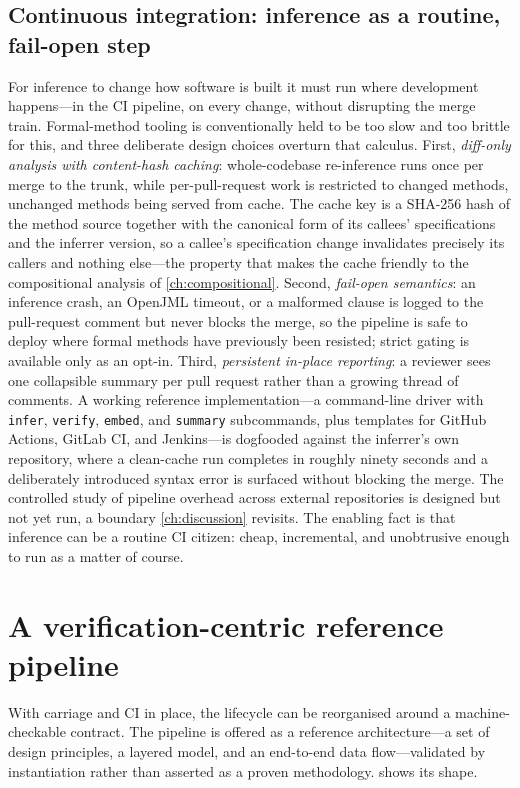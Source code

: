 \subsection{Continuous integration: inference as a routine, fail-open step}\label{sec:int-ci}

For inference to change how software is built it must run where development
happens---in the CI pipeline, on every change, without disrupting the merge train.
Formal-method tooling is conventionally held to be too slow and too brittle for
this, and three deliberate design choices overturn that calculus. First,
\emph{diff-only analysis with content-hash caching}: whole-codebase re-inference
runs once per merge to the trunk, while per-pull-request work is restricted to
changed methods, unchanged methods being served from cache. The cache key is a
SHA-256 hash of the method source together with the canonical form of its callees'
specifications and the inferrer version, so a callee's specification change
invalidates precisely its callers and nothing else---the property that makes the
cache friendly to the compositional analysis of \cref{ch:compositional}. Second,
\emph{fail-open semantics}: an inference crash, an OpenJML timeout, or a malformed
clause is logged to the pull-request comment but never blocks the merge, so the
pipeline is safe to deploy where formal methods have previously been resisted;
strict gating is available only as an opt-in. Third, \emph{persistent in-place
reporting}: a reviewer sees one collapsible summary per pull request rather than a
growing thread of comments. A working reference implementation---a command-line
driver with \texttt{infer}, \texttt{verify}, \texttt{embed}, and \texttt{summary}
subcommands, plus templates for GitHub Actions, GitLab CI, and Jenkins---is
dogfooded against the inferrer's own repository, where a clean-cache run completes
in roughly ninety seconds and a deliberately introduced syntax error is surfaced
without blocking the merge. The controlled study of pipeline overhead across
external repositories is designed but not yet run, a boundary \cref{ch:discussion}
revisits. The enabling fact is that inference can be a routine CI citizen: cheap,
incremental, and unobtrusive enough to run as a matter of course.

\section{A verification-centric reference pipeline}\label{sec:int-pipeline}

With carriage and CI in place, the lifecycle can be reorganised around a
machine-checkable contract. The pipeline is offered as a reference
architecture---a set of design principles, a layered model, and an end-to-end data
flow---validated by instantiation rather than asserted as a proven methodology.
 shows its shape.

